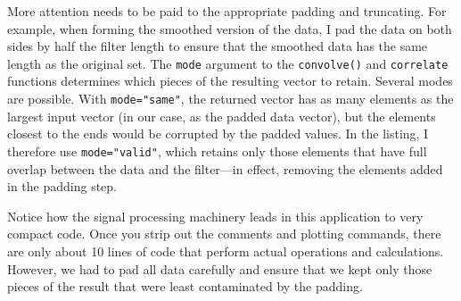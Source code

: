 More attention needs to be paid to the appropriate padding and
truncating. For example, when forming the smoothed version of the
data, I pad the data on both sides by half the filter length to ensure
that the smoothed data has the same length as the original set. The
\texttt{mode} argument to the \texttt{convolve()} and
\texttt{correlate} functions determines which pieces of the resulting
vector to retain. Several modes are possible. With
\texttt{mode="same"}, the returned vector has as many elements as the
largest input vector (in our case, as the padded data vector), but the
elements closest to the ends would be corrupted by the padded values.
In the listing, I therefore use \texttt{mode="valid"}, which retains
only those elements that have full overlap between the data and the
filter---in effect, removing the elements added in the padding step.

Notice how the signal processing machinery leads in this application
to very compact code. Once you strip out the comments and plotting
commands, there are only about 10 lines of code that perform actual
operations  and calculations.  However, we had to pad all data
carefully and ensure that we kept only those pieces of the result that
were least contaminated by the padding.


% 
% 
% 

